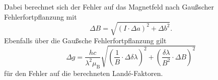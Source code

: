  Dabei berechnet sich der Fehler auf das Magnetfeld nach Gaußscher Fehlerfortpflanzung mit 
 \begin{equation}
     \Delta B = \sqrt{(I\cdot \Delta a)^2 + \Delta b^2} .
 \end{equation}
 Ebenfalls über die Gaußsche Fehlerfortpflanzung gilt 
 \begin{equation}
    \Delta g = \frac{hc}{\lambda^2 \mu_\text{B}} \sqrt{(\frac{1}{B} \cdot \Delta \delta \lambda)^2 + (\frac{\delta \lambda}{B^2}\cdot \Delta B)^2} 
 \end{equation} \noindent
 für den Fehler auf die berechneten Landé-Faktoren.

